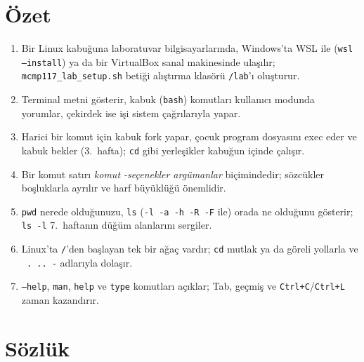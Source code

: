 \documentclass[11pt,a4paper]{article}
\newcommand{\cmd}[1]{\texttt{#1}}
\begin{document}
\section{Özet}

\begin{keyidea}
\begin{enumerate}[leftmargin=1.4em]
  \item Bir Linux kabuğuna laboratuvar bilgisayarlarında, Windows'ta WSL ile (\cmd{wsl --install}) ya da bir VirtualBox sanal makinesinde ulaşılır; \texttt{mcmp117\_lab\_setup.sh} betiği alıştırma klasörü \texttt{\tl/lab}'ı oluşturur.
  \item Terminal metni gösterir, kabuk (\cmd{bash}) komutları kullanıcı modunda yorumlar, çekirdek ise işi sistem çağrılarıyla yapar.
  \item Harici bir komut için kabuk fork yapar, çocuk program dosyasını exec eder ve kabuk bekler (3.\ hafta); \cmd{cd} gibi yerleşikler kabuğun içinde çalışır.
  \item Bir komut satırı \emph{komut -seçenekler argümanlar} biçimindedir; sözcükler boşluklarla ayrılır ve harf büyüklüğü önemlidir.
  \item \cmd{pwd} nerede olduğunuzu, \cmd{ls} (\cmd{-l -a -h -R -F} ile) orada ne olduğunu gösterir; \cmd{ls -l} 7.\ haftanın düğüm alanlarını sergiler.
  \item Linux'ta \texttt{/}'den başlayan tek bir ağaç vardır; \cmd{cd} mutlak ya da göreli yollarla ve \texttt{\tl\ . .. -} adlarıyla dolaşır.
  \item \cmd{--help}, \cmd{man}, \cmd{help} ve \cmd{type} komutları açıklar; Tab, geçmiş ve \texttt{Ctrl+C}/\texttt{Ctrl+L} zaman kazandırır.
\end{enumerate}
\end{keyidea}

\section{Sözlük}
\end{document}
